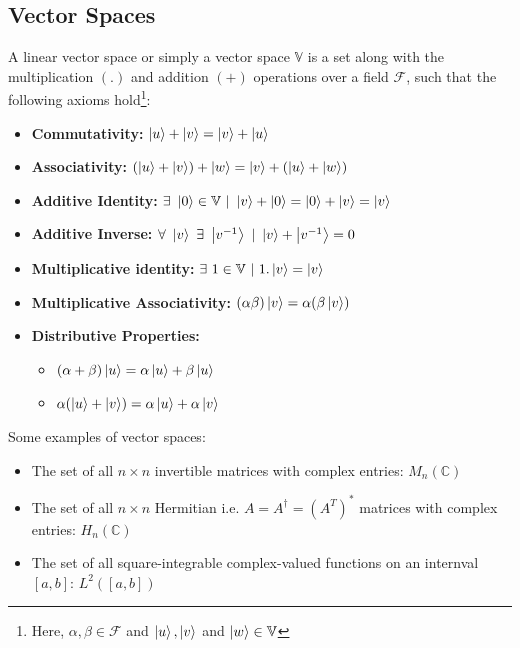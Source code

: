 \subsection{Vector Spaces}
A linear vector space or simply a vector space $\mathbb{V}$ is a set along with the multiplication $(.)$ and addition $(+)$ operations over a field $\mathcal{F}$, such that the following axioms hold\footnote{Here, $\alpha , \beta \in \mathcal{F}$ and $\ket{u}, \ket{v} $ and $\ket{w} \in \mathbb{V}$}:
\begin{itemize}
	\item \textbf{Commutativity:} $\ket{u} + \ket{v} = \ket{v} + \ket{u}$
	\item \textbf{Associativity:} $(\ket{u} + \ket{v}) + \ket{w} = \ket{v} + (\ket{u} + \ket{w})$
	\item \textbf{Additive Identity:} 
	$\exists \  \ket{0} \in \mathbb{V} \ | \ \ket{v} + \ket{0} = \ket{0} + \ket{v} = \ket{v}$
	\item \textbf{Additive Inverse:} $\forall \ \ket{v} \ \exists \ \ket{v^{-1}} \ | \ \ket{v} + \ket{v^{-1}} = 0$
	\item \textbf{Multiplicative identity:} $\exists \ 1 \in \mathbb{V} \ | \ 1 .\ket{v} = \ket{v}$
	\item \textbf{Multiplicative Associativity:}  $(\alpha \beta) \ket{v} = \alpha (\beta \ket{v})$
	\item \textbf{Distributive Properties:} 
	\begin{itemize}
		\item $(\alpha + \beta) \ket{u} = \alpha \ket{u} + \beta \ket{u}$
		\item $\alpha (\ket{u} + \ket{v}) = \alpha \ket{u} + \alpha \ket{v}$
	\end{itemize}
\end{itemize}
Some examples of vector spaces:
\begin{itemize}
    \item The set of all $n \times n$ invertible matrices with complex entries: $M_{n}(\mathbb{C})$
    \item The set of all $n \times n$ Hermitian i.e. $A = A^{\dagger} = {(A^{T})}^{*}$ matrices with complex entries: $H_{n}(\mathbb{C})$
    \item The set of all square-integrable complex-valued functions on an internval $[a,b]$: $L^{2}([a,b])$
\end{itemize}


